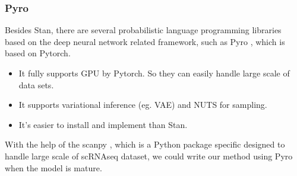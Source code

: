 \begin{frame}
  \frametitle{Pyro}
  Besides Stan, there are several probabilistic language programming libraries
  based on the deep neural network related framework, such as Pyro
  \cite{bingham2019pyro}, which is based on Pytorch.
  \begin{itemize}
  \item
    It fully supports GPU by Pytorch. So they can easily handle large scale of
    data sets.
  \item
    It supports variational inference (eg. VAE) and NUTS for sampling.
  \item
    It's easier to install and implement than Stan.
  \end{itemize}

  With the help of the scanpy \cite{wolf2018scanpy}, which is a Python package specific designed
  to handle large scale of scRNAseq dataset, we could write our method using Pyro
  when the model is mature.
\end{frame}
